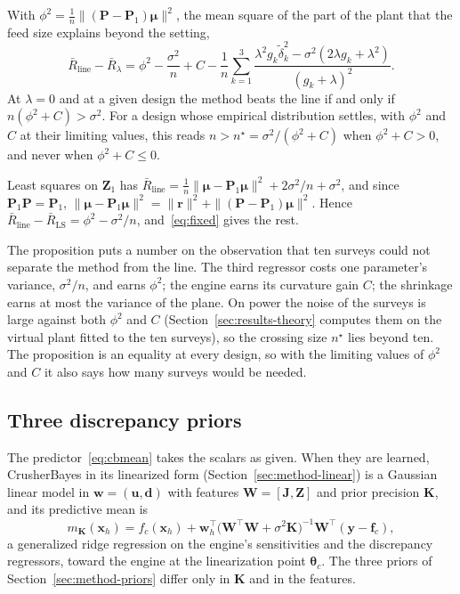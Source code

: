\begin{proposition}\label{prop:line}
With $\phi^2=\frac1n\|(\mathbf P-\mathbf P_1)\boldsymbol\mu\|^2$, the mean square of the part of the plant that the feed size
explains beyond the setting,
\begin{equation}
\bar R_{\mathrm{line}}-\bar R_\lambda=\phi^2-\frac{\sigma^2}{n}+C-\frac1n\sum_{k=1}^{3}\frac{\lambda^2g_k\tilde\delta_k^2-\sigma^2(2\lambda g_k+\lambda^2)}{(g_k+\lambda)^2}.
\label{eq:line}
\end{equation}
At $\lambda=0$ and at a given design the method beats the line if and only if $n(\phi^2+C)>\sigma^2$. For a design whose
empirical distribution settles, with $\phi^2$ and $C$ at their limiting values, this reads $n>n^\star=\sigma^2/(\phi^2+C)$ when
$\phi^2+C>0$, and never when $\phi^2+C\le0$.
\end{proposition}
\begin{IEEEproof}
Least squares on $\mathbf Z_1$ has $\bar R_{\mathrm{line}}=\frac1n\|\boldsymbol\mu-\mathbf P_1\boldsymbol\mu\|^2+2\sigma^2/n+\sigma^2$, and
since $\mathbf P_1\mathbf P=\mathbf P_1$, $\|\boldsymbol\mu-\mathbf P_1\boldsymbol\mu\|^2=\|\mathbf r\|^2+\|(\mathbf P-\mathbf
P_1)\boldsymbol\mu\|^2$. Hence $\bar R_{\mathrm{line}}-\bar R_{\mathrm{LS}}=\phi^2-\sigma^2/n$, and~\eqref{eq:fixed} gives the rest.
\end{IEEEproof}

The proposition puts a number on the observation that ten surveys could not separate the method from the line. The third
regressor costs one parameter's variance, $\sigma^2/n$, and earns $\phi^2$; the engine earns its curvature gain $C$; the
shrinkage earns at most the variance of the plane. On power the noise of the surveys is large against both $\phi^2$ and
$C$ (Section~\ref{sec:results-theory} computes them on the virtual plant fitted to the ten surveys), so the crossing size
$n^\star$ lies beyond ten. The proposition is an equality at every design, so with the limiting values of $\phi^2$ and $C$ it
also says how many surveys would be needed.

\subsection{Three discrepancy priors}

The predictor~\eqref{eq:cbmean} takes the scalars as given. When they are learned, CrusherBayes in its linearized form
(Section~\ref{sec:method-linear}) is a Gaussian linear model in $\mathbf w=(\mathbf u,\mathbf d)$ with features $\mathbf
W=[\mathbf J,\mathbf Z]$ and prior precision $\mathbf K$, and its predictive mean is
\begin{equation}
m_{\mathbf K}(\mathbf x_h)=f_c(\mathbf x_h)+\mathbf w_h^{\top}\big(\mathbf W^{\top}\mathbf W+\sigma^2\mathbf K\big)^{-1}\mathbf W^{\top}(\mathbf y-\mathbf f_c),
\label{eq:genridge}
\end{equation}
a generalized ridge regression on the engine's sensitivities and the discrepancy regressors, toward the engine at the
linearization point $\boldsymbol\theta_c$. The three priors of Section~\ref{sec:method-priors} differ only in $\mathbf K$ and in
the features.


